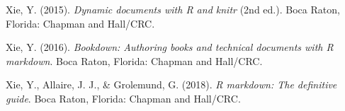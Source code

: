 \documentclass[
  ,man,mask,floatsintext]{apa6}
\newlength{\cslhangindent}
\newlength{\cslentryspacingunit} %
\newenvironment{CSLReferences}[2] %
 {%
  \setlength{\parindent}{0pt}
  \ifodd #1
  \let\oldpar\par
  \def\par{\hangindent=\cslhangindent\oldpar}
  \fi
  \setlength{\parskip}{#2\cslentryspacingunit}
 }%
 {}
\begin{document}
\begin{CSLReferences}{1}{0}
\leavevmode{}%
Xie, Y. (2015). \emph{Dynamic documents with {R} and knitr} (2nd ed.). Boca Raton, Florida: {Chapman and Hall/CRC}.

\leavevmode{}%
Xie, Y. (2016). \emph{Bookdown: {Authoring} books and technical documents with {R} markdown}. Boca Raton, Florida: {Chapman and Hall/CRC}.

\leavevmode{}%
Xie, Y., Allaire, J. J., \& Grolemund, G. (2018). \emph{R markdown: {The} definitive guide}. Boca Raton, Florida: {Chapman and Hall/CRC}.

\end{CSLReferences}
\end{document}
